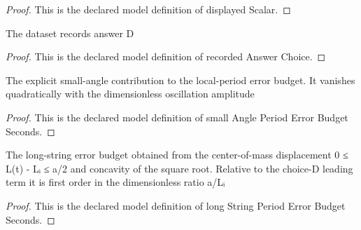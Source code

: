 \begin{proof}
  This is the declared model definition of displayed Scalar.
\end{proof}
\begin{definition}
  \label{def:physics:phyx-mini-0238:phyxminiproblems-problemphyxmini0238-recordedanswerchoice}
  The dataset records answer D
\end{definition}
\begin{proof}
  This is the declared model definition of recorded Answer Choice.
\end{proof}
\begin{definition}
  \label{def:physics:phyx-mini-0238:phyxminiproblems-problemphyxmini0238-smallangleperioderrorbudgetseconds}
  The explicit small-angle contribution to the local-period error budget. It vanishes quadratically with the dimensionless oscillation amplitude
\end{definition}
\begin{proof}
  This is the declared model definition of small Angle Period Error Budget Seconds.
\end{proof}
\begin{definition}
  \label{def:physics:phyx-mini-0238:phyxminiproblems-problemphyxmini0238-longstringperioderrorbudgetseconds}
  The long-string error budget obtained from the center-of-mass displacement 0 ≤ L(t) - Lᵢ ≤ a/2 and concavity of the square root. Relative to the choice-D leading term it is first order in the dimensionless ratio a/Lᵢ
\end{definition}
\begin{proof}
  This is the declared model definition of long String Period Error Budget Seconds.
\end{proof}
